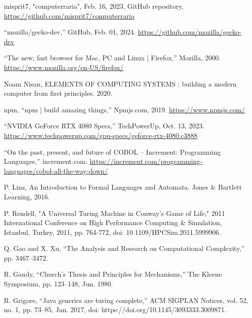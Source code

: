 \documentclass[12pt]{report} %
\begin{document}
\begin{singlespace}
\begin{thebibliography}{}
             misprit7, "computerraria", Feb. 16, 2023, GitHub repository, \href{https://github.com/misprit7/computerraria}{https://github.com/misprit7/computerraria}
            
             “mozilla/gecko-dev,” GitHub, Feb. 01, 2024. \href{https://github.com/mozilla/gecko-dev}{https://github.com/mozilla/gecko-dev}
            
             “The new, fast browser for Mac, PC and Linux | Firefox,” Mozilla, 2000. \href{https://www.mozilla.org/en-US/firefox/}{https://www.mozilla.org/en-US/firefox/}
            
             Noam Nisan, ELEMENTS OF COMPUTING SYSTEMS : building a modern computer from first principles. 2020.
            
             npm, “npm | build amazing things,” Npmjs.com, 2019. \href{https://www.npmjs.com/}{https://www.npmjs.com/}
            
             “NVIDIA GeForce RTX 4080 Specs,” TechPowerUp, Oct. 13, 2023. \href{https://www.techpowerup.com/gpu-specs/geforce-rtx-4080.c3888}{https://www.techpowerup.com/gpu-specs/geforce-rtx-4080.c3888}
            
             “On the past, present, and future of COBOL – Increment: Programming Languages,” increment.com. \href{https://increment.com/programming-languages/cobol-all-the-way-down/}{https://increment.com/programming-languages/cobol-all-the-way-down/}
            
             P. Linz, An Introduction to Formal Languages and Automata. Jones \& Bartlett Learning, 2016.
            
             P. Rendell, "A Universal Turing Machine in Conway's Game of Life," 2011 International Conference on High Performance Computing \& Simulation, Istanbul, Turkey, 2011, pp. 764-772, doi: 10.1109/HPCSim.2011.5999906.

             Q. Gao and X. Xu, “The Analysis and Research on Computational Complexity,” pp. 3467–3472.

             R. Gandy, “Church’s Thesis and Principles for Mechanisms,” The Kleene Symposium, pp. 123–148, Jun. 1980.

             R. Grigore, “Java generics are turing complete,” ACM SIGPLAN Notices, vol. 52, no. 1, pp. 73–85, Jan. 2017, doi: https://doi.org/10.1145/3093333.3009871.


\end{thebibliography}
\end{singlespace}
\end{document}
